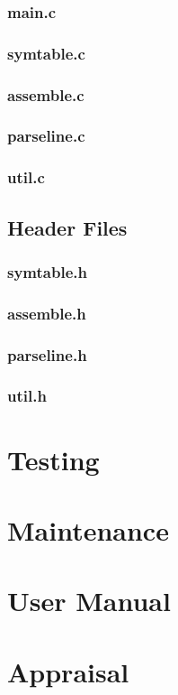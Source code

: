 \documentclass[a4paper]{report}
\begin{document}
\subsection{main.c}

\subsection{symtable.c}

\subsection{assemble.c}

\subsection{parseline.c}

\subsection{util.c}


\section{Header Files}

\subsection{symtable.h}

\subsection{assemble.h}

\subsection{parseline.h}

\subsection{util.h}




\chapter{Testing}



\chapter{Maintenance}



\chapter{User Manual}



\chapter{Appraisal}
\end{document}
